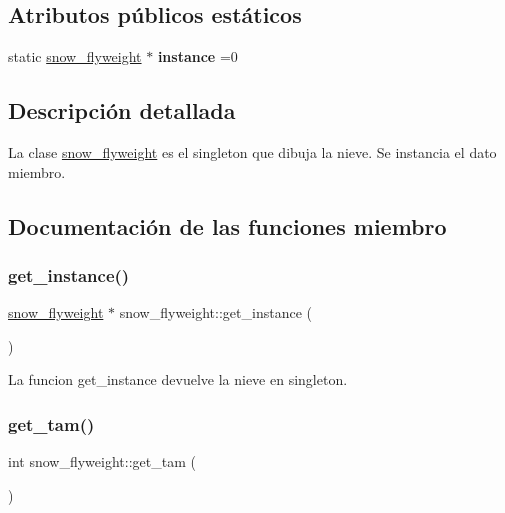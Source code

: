 \subsection*{Atributos públicos estáticos}
\begin{DoxyCompactItemize}
\item 
\mbox{\label{classsnow__flyweight_a88b4b4efea791663431768a955ef36f6}} 
static \hyperlink{classsnow__flyweight}{snow\+\_\+flyweight} $\ast$ {\bfseries instance} =0
\end{DoxyCompactItemize}


\subsection{Descripción detallada}
La clase \hyperlink{classsnow__flyweight}{snow\+\_\+flyweight} es el singleton que dibuja la nieve.  Se instancia el dato miembro. 

\subsection{Documentación de las funciones miembro}
\mbox{\label{classsnow__flyweight_a6035abfd67cce3ff166a5c9fc00e286c}} 
\subsubsection{\texorpdfstring{get\+\_\+instance()}{get\_instance()}}
{\footnotesize\ttfamily \hyperlink{classsnow__flyweight}{snow\+\_\+flyweight} $\ast$ snow\+\_\+flyweight\+::get\+\_\+instance (\begin{DoxyParamCaption}{ }\end{DoxyParamCaption})\hspace{0.3cm}{\ttfamily [static]}}

La funcion get\+\_\+instance devuelve la nieve en singleton. \mbox{\label{classsnow__flyweight_a64f410373e401b52629c93bf917b4b41}} 
\subsubsection{\texorpdfstring{get\+\_\+tam()}{get\_tam()}}
{\footnotesize\ttfamily int snow\+\_\+flyweight\+::get\+\_\+tam (\begin{DoxyParamCaption}{ }\end{DoxyParamCaption})}

